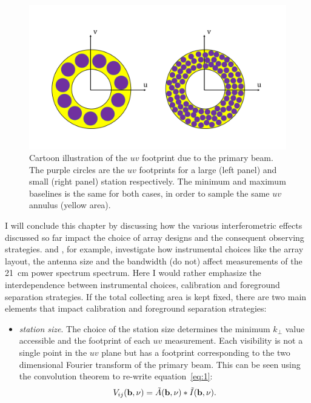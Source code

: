 {\begin{figure}[]
\begin{center}
\includegraphics[width=1.\textwidth]{Bernardi/uv_footprint_1}
\end{center}
\caption{Cartoon illustration of the $uv$ footprint due to the primary beam. The purple circles are the $uv$ footprints for a large (left panel) and small (right panel) station respectively. The minimum and maximum baselines is the same for both cases, in order to sample the same $uv$ annulus (yellow area).}
\label{fig:fig6}
\end{figure}
I will conclude this chapter by discussing how the various interferometric effects discussed so far impact the choice of array designs and the consequent observing strategies. \cite{morales05} and \cite{parsons12b}, for example, investigate how instrumental choices like the array layout, the antenna size and the bandwidth (do not) affect measurements of the 21~cm power spectrum spectrum. Here I would rather emphasize the interdependence between instrumental choices, calibration and foreground separation strategies. If the total collecting area is kept fixed, there are two main elements that impact calibration and foreground separation strategies:
\begin{itemize}
\item {\it station size}. The choice of the station size determines the minimum $k_\perp$ value accessible and the footprint of each $uv$ measurement. Each visibility is not a single point in the $uv$ plane but has a footprint corresponding to the two dimensional Fourier transform of the primary beam. This can be seen using the convolution theorem to re-write equation~\ref{eq:1}: \begin{equation}
V_{ij} ({\bf b}, \nu) = \tilde{A} ({\bf b}, \nu) \ast \tilde{I} ({\bf b}, \nu).
\end{equation}

\end{itemize}}
